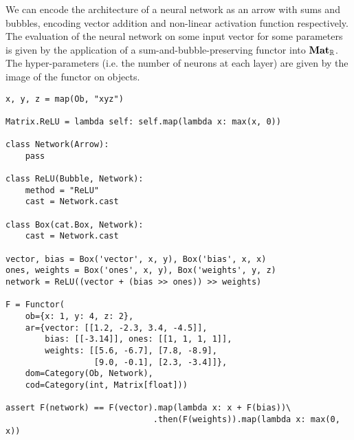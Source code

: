 \begin{example}\label{example:neural-net}
We can encode the architecture of a neural network as an arrow with sums and bubbles, encoding vector addition and non-linear activation function respectively.
The evaluation of the neural network on some input vector for some parameters is given by the application of a sum-and-bubble-preserving functor into $\mathbf{Mat}_{\mathbb{R}}$.
The hyper-parameters (i.e. the number of neurons at each layer) are given by the image of the functor on objects.

\begin{verbatim}
x, y, z = map(Ob, "xyz")

Matrix.ReLU = lambda self: self.map(lambda x: max(x, 0))

class Network(Arrow):
    pass

class ReLU(Bubble, Network):
    method = "ReLU"
    cast = Network.cast

class Box(cat.Box, Network):
    cast = Network.cast

vector, bias = Box('vector', x, y), Box('bias', x, x)
ones, weights = Box('ones', x, y), Box('weights', y, z)
network = ReLU((vector + (bias >> ones)) >> weights)

F = Functor(
    ob={x: 1, y: 4, z: 2},
    ar={vector: [[1.2, -2.3, 3.4, -4.5]],
        bias: [[-3.14]], ones: [[1, 1, 1, 1]],
        weights: [[5.6, -6.7], [7.8, -8.9],
                  [9.0, -0.1], [2.3, -3.4]]},
    dom=Category(Ob, Network),
    cod=Category(int, Matrix[float]))

assert F(network) == F(vector).map(lambda x: x + F(bias))\
                              .then(F(weights)).map(lambda x: max(0, x))
\end{verbatim}
\end{example}

